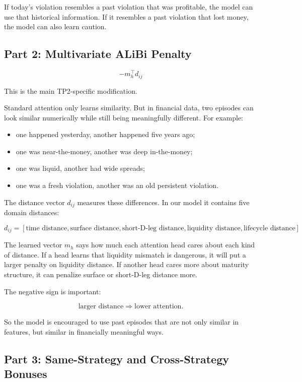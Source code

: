\documentclass[11pt]{article}
\newcommand{\1}{\mathbf{1}}
\begin{document}
If today's violation resembles a past violation that was profitable, the model
can use that historical information. If it resembles a past violation that
lost money, the model can also learn caution.

\subsection{Part 2: Multivariate ALiBi Penalty}

\[
  -m_h^\top d_{ij}
\]

This is the main TP2-specific modification.

Standard attention only learns similarity. But in financial data, two episodes
can look similar numerically while still being meaningfully different. For
example:

\begin{itemize}[leftmargin=*]
  \item one happened yesterday, another happened five years ago;
  \item one was near-the-money, another was deep in-the-money;
  \item one was liquid, another had wide spreads;
  \item one was a fresh violation, another was an old persistent violation.
\end{itemize}

The distance vector \(d_{ij}\) measures these differences. In our model it
contains five domain distances:

\[
  d_{ij}
  =
  [
  \text{time distance},
  \text{surface distance},
  \text{short-D-leg distance},
  \text{liquidity distance},
  \text{lifecycle distance}
  ].
\]

The learned vector \(m_h\) says how much each attention head cares about each
kind of distance. If a head learns that liquidity mismatch is dangerous, it
will put a larger penalty on liquidity distance. If another head cares more
about maturity structure, it can penalize surface or short-D-leg distance more.

The negative sign is important:

\[
  \text{larger distance} \Rightarrow \text{lower attention}.
\]

So the model is encouraged to use past episodes that are not only similar in
features, but similar in financially meaningful ways.

\subsection{Part 3: Same-Strategy and Cross-Strategy Bonuses}
\end{document}
